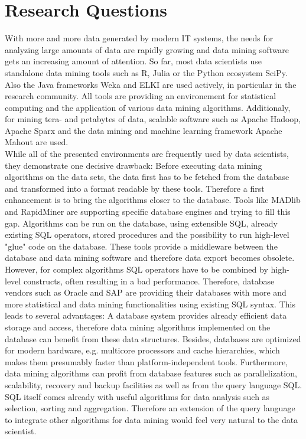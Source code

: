 \section{Research Questions}
With more and more data generated by modern IT systems, the needs for analyzing large amounts of data are rapidly growing and data mining software gets an increasing amount of attention. So far, most data scientists use standalone data mining tools such as R, Julia or the Python ecosystem SciPy. Also the Java frameworks Weka and ELKI are used actively, in particular in the research community. All tools are providing an environement for statistical computing and the application of various data mining algorithms. Additionaly, for mining tera- and petabytes of data, scalable software such as Apache Hadoop, Apache Sparx and the data mining and machine learning framework Apache Mahout are used.
\\
While all of the presented environments are frequently used by data scientists, they demonstrate one decisive drawback: Before executing data mining algorithms on the data sets, the data first has to be fetched from the database and transformed into a format readable by these tools. Therefore a first enhancement is to bring the algorithms closer to the database. Tools like MADlib and RapidMiner are supporting specific database engines and trying to fill this gap. Algorithms can be run on the database, using extensible SQL, already existing SQL operators, stored procedures and the possibility to run high-level "glue" code on the database. These tools provide a middleware between the database and data mining software and therefore data export becomes obsolete. 
\\
However, for complex algorithms SQL operators have to be combined by high-level constructs, often resulting in a bad performance. Therefore, database vendors such as Oracle and SAP are providing their databases with more and more statistical and data mining functionalities using existing SQL syntax. This leads to several advantages: A database system provides already efficient data storage and access, therefore data mining algorithms implemented on the database can benefit from these data structures. Besides, databases are optimized for modern hardware, e.g. multicore processors and cache hierarchies, which makes them presumably faster than platform-independent tools. Furthermore, data mining algorithms can profit from database features such as parallelization, scalability, recovery and backup facilities as well as from the query language SQL. SQL itself comes already with useful algorithms for data analysis such as selection, sorting and aggregation. Therefore an extension of the query language to integrate other algorithms for data mining would feel very natural to the data scientist. 
